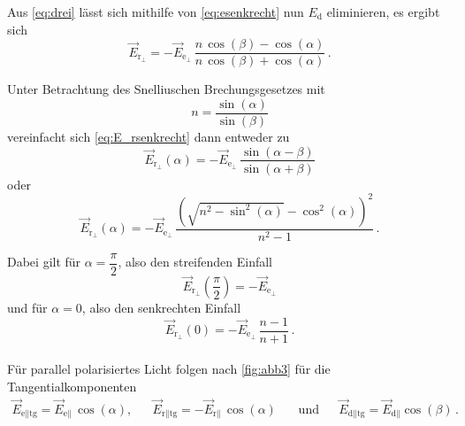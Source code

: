 Aus \eqref{eq:drei} lässt sich mithilfe von \eqref{eq:esenkrecht} nun $E_{\text{d}}$ eliminieren, es ergibt sich
\begin{equation}
    \vec{E}_{\text{r}_{\perp}} = - \vec{E}_{\text{e}_{\perp}} \, \frac{n \, \cos(\beta) - \cos(\alpha)}{n \, \cos(\beta) + \cos(\alpha)} \,.
    \label{eq:E_rsenkrecht}
\end{equation}

Unter Betrachtung des Snelliuschen Brechungsgesetzes mit
\begin{equation*}
    n = \frac{\sin(\alpha)}{\sin(\beta)}
    \label{eq:snellius}
\end{equation*}
vereinfacht sich \eqref{eq:E_rsenkrecht} dann entweder zu
\begin{equation*}
    \vec{E}_{\text{r}_{\perp}}(\alpha) = - \vec{E}_{\text{e}_{\perp}} \, \frac{\sin(\alpha - \beta)}{\sin(\alpha + \beta)}
\end{equation*}
oder
\begin{equation}
    \vec{E}_{\text{r}_{\perp}}(\alpha) = - \vec{E}_{\text{e}_{\perp}} \, \frac{\left( \sqrt{n^2 - \sin^2(\alpha)} - \cos^2(\alpha) \right)^2}{n^2 - 1} \,.
    \label{eq:E_rsenkrecht+snell}
\end{equation}

Dabei gilt für $\alpha = \dfrac{\pi}{2}$, also den streifenden Einfall
\begin{equation*}
    \vec{E}_{\text{r}_{\perp}} \left(\frac{\pi}{2} \right) = - \vec{E}_{\text{e}_{\perp}}
\end{equation*}
und für $\alpha = 0$, also den senkrechten Einfall
\begin{equation*}
    \vec{E}_{\text{r}_{\perp}}(0) = - \vec{E}_{\text{e}_{\perp}} \, \frac{n - 1}{n + 1} \,.
\end{equation*} \\

Für parallel polarisiertes Licht folgen nach \autoref{fig:abb3} für die Tangentialkomponenten
\begin{align*}
    \vec{E}_{\text{e}\parallel \text{tg}} = \vec{E}_{\text{e}\parallel} \, \cos(\alpha), && \vec{E}_{\text{r}\parallel \text{tg}} = - \vec{E}_{\text{r}\parallel} \, \cos(\alpha) \, &&
    \text{und} && \vec{E}_{\text{d}\parallel \text{tg}} = \vec{E}_{\text{d}\parallel} \cos(\beta) \,.
\end{align*}

